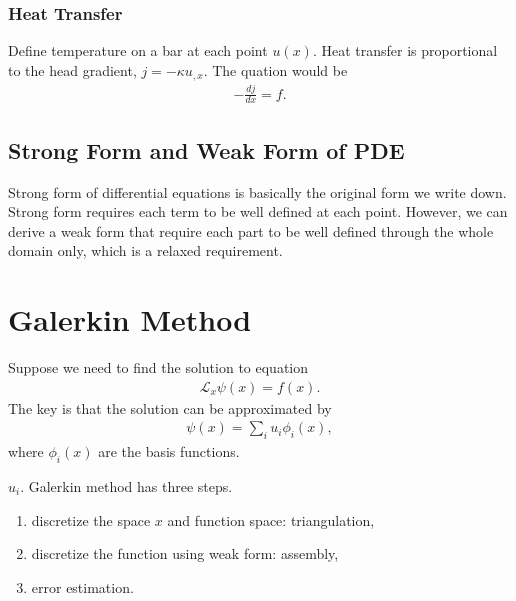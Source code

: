 \documentclass[letterpaper,12pt,english]{sphinxmanual}
\begin{document}
\subsubsection{Heat Transfer}
\label{\detokenize{finite-element-method/pde-and-boundary-conditions:heat-transfer}}
Define temperature on a bar at each point \(u(x)\). Heat transfer is proportional to the head gradient, \(j= - \kappa u_{,x}\). The quation would be
\begin{equation*}
\begin{split}- \frac{dj}{dx} = f.\end{split}
\end{equation*}

\subsection{Strong Form and Weak Form of PDE}
\label{\detokenize{finite-element-method/pde-and-boundary-conditions:strong-form-and-weak-form-of-pde}}
Strong form of differential equations is basically the original form we write down. Strong form requires each term to be well defined at each point. However, we can derive a weak form that require each part to be well defined through the whole domain only, which is a relaxed requirement.


\section{Galerkin Method}
\label{\detokenize{finite-element-method/galerkin-method::doc}}\label{\detokenize{finite-element-method/galerkin-method:galerkin-method}}
Suppose we need to find the solution to equation
\begin{equation*}
\begin{split}\mathcal L_{x} \psi(x) = f(x).\end{split}
\end{equation*}
The key is that the solution can be approximated by
\begin{equation*}
\begin{split}\psi(x) = \sum_i u_i \phi_i(x),\end{split}
\end{equation*}
where \(\phi_i(x)\) are the basis functions.

 \(u_i\). Galerkin method has three steps.
\begin{enumerate}
\item {} 
discretize the space \(x\) and function space: triangulation,

\item {} 
discretize the function using weak form: assembly,

\item {} 
error estimation.

\end{enumerate}
\end{document}
